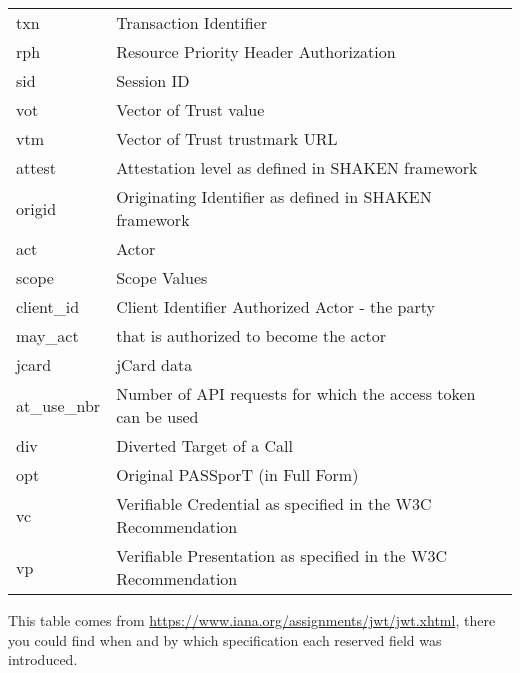 {\begin{longtable}{||l|l|}
        txn                       & Transaction Identifier\\
        rph                       & Resource Priority Header Authorization\\
        sid                       & Session ID\\
        vot                       & Vector of Trust value\\
        vtm                       & Vector of Trust trustmark URL\\
        attest                    & Attestation level as defined in SHAKEN framework\\
        origid                    & Originating Identifier as defined in SHAKEN framework\\
        act                       & Actor\\
        scope                     & Scope Values\\
        client\_id                 & Client Identifier Authorized Actor - the party\\
        may\_act                   & that is authorized to become the actor\\
        jcard                     & jCard data\\
        at\_use\_nbr                & Number of API requests for which the access token can be used\\
        div                       & Diverted Target of a Call\\
        opt                       & Original PASSporT (in Full Form)\\
        vc                        & Verifiable Credential as specified in the W3C Recommendation\\
        vp                        & Verifiable Presentation as specified in the W3C Recommendation\\
        \hline
    \end{longtable}
}

This table comes from \url{https://www.iana.org/assignments/jwt/jwt.xhtml},
there you could find when and by which specification each reserved field was
introduced.

\restoregeometry
